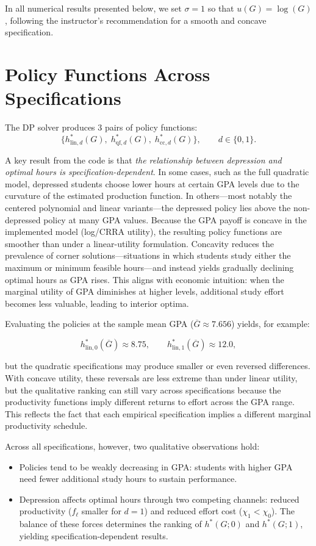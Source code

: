 \documentclass[12pt]{article}
\begin{document}
In all numerical results presented below, we set $\sigma = 1$ so that
$u(G)=\log(G)$, following the instructor’s recommendation for a smooth
and concave specification.


\section{Policy Functions Across Specifications}
\label{sec:dp_results}

The DP solver produces 3 pairs of policy functions:
\[
\{h^*_{\mathrm{lin},d}(G), \;
  h^*_{\mathrm{qf},d}(G), \;
  h^*_{\mathrm{cc},d}(G)\}, \qquad d \in \{0,1\}.
\]

A key result from the code is that \emph{the relationship between
depression and optimal hours is specification-dependent}. In some cases,
such as the full quadratic model, depressed students choose lower hours
at certain GPA levels due to the curvature of the estimated production
function. In others---most notably the centered polynomial and linear
variants---the depressed policy lies above the non-depressed policy at
many GPA values.
Because the GPA payoff is concave in the implemented model (log/CRRA
utility), the resulting policy functions are smoother than under a
linear-utility formulation. Concavity reduces the prevalence of corner
solutions—situations in which students study either the maximum or
minimum feasible hours—and instead yields gradually declining optimal
hours as GPA rises. This aligns with economic intuition: when the
marginal utility of GPA diminishes at higher levels, additional study
effort becomes less valuable, leading to interior optima.


Evaluating the policies at the sample mean GPA 
($\overline{G}\approx 7.656$) yields, for example:

\[
h^*_{\mathrm{lin},0}(\overline{G}) \approx 8.75, \qquad
h^*_{\mathrm{lin},1}(\overline{G}) \approx 12.0,
\]

but the quadratic specifications may produce smaller or even reversed
differences. With concave utility, these reversals are less extreme than
under linear utility, but the qualitative ranking can still vary across
specifications because the productivity functions imply different
returns to effort across the GPA range. This reflects the fact that each
empirical specification implies a different marginal productivity
schedule.


Across all specifications, however, two qualitative observations hold:

\begin{itemize}
    \item Policies tend to be weakly decreasing in GPA: students with
          higher GPA need fewer additional study hours to sustain
          performance.
    \item Depression affects optimal hours through two competing
          channels: reduced productivity ($f_{\ell}$ smaller for $d=1$)
          and reduced effort cost ($\chi_1 < \chi_0$). The balance of
          these forces determines the ranking of $h^*(G;0)$ and
          $h^*(G;1)$, yielding specification-dependent results.
\end{itemize}
\end{document}
